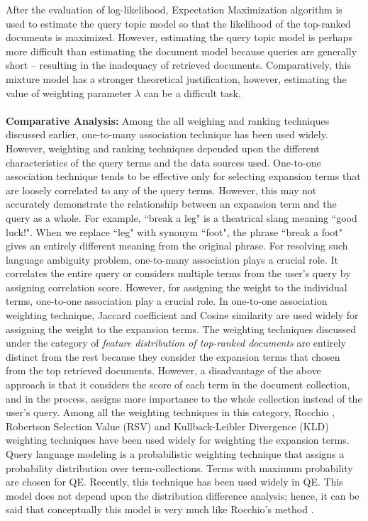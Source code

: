 After the evaluation of log-likelihood, Expectation Maximization algorithm \cite{dempster1977maximum} is used to estimate the query topic model so that the likelihood of the top-ranked documents is maximized. However, estimating the query topic model is perhaps more difficult than estimating the document model because queries are generally short -- resulting in the inadequacy of retrieved documents.  Comparatively, this mixture model has a stronger theoretical justification, however, estimating the value of weighting parameter $\lambda$ can be a difficult task.
\\\\
\textbf{Comparative Analysis:}
Among the all weighing and ranking techniques discussed earlier, one-to-many association technique has been used widely. However, weighting and ranking techniques depended upon the different characteristics of the query terms and  the data sources used. One-to-one association technique tends to be effective only for selecting expansion terms that are loosely correlated to any of the query terms. However, this may not accurately demonstrate the relationship between an expansion term and the query as a whole. For example, ``break a leg" is a theatrical slang meaning ``good luck!".  When we replace ``leg" with synonym ``foot", the phrase ``break a foot" gives an  entirely different meaning from the original phrase. For resolving such language ambiguity problem, one-to-many association plays a crucial role. It correlates the entire query or considers  multiple terms from the user's query by assigning correlation score. However, for assigning the weight to the individual terms, one-to-one association play a crucial role. In one-to-one association weighting technique, Jaccard coefficient \cite{jaccard1912distribution} and Cosine similarity \cite{attar1977local} are used widely for assigning the weight to the expansion terms. The weighting techniques discussed under the category of \textit{feature distribution of top-ranked documents} are entirely distinct from the rest because they consider the expansion terms that chosen from the top retrieved documents. However, a disadvantage of the above approach is that it considers the score of each term in the document collection, and in the process, assigns more importance to the whole collection instead of the user's query. Among all the weighting techniques in this category, Rocchio \cite{rocchio1971relevance}, Robertson Selection Value (RSV) \cite{robertson1976relevance} and Kullback-Leibler Divergence (KLD) \cite{carpineto2001information} weighting techniques have been used widely for weighting the expansion terms. Query language modeling is a probabilistic weighting technique that assigns a probability distribution over term-collections. Terms with maximum probability are chosen for QE. Recently, this technique has been used widely in QE. This model does not depend upon the distribution difference analysis; hence, it can be said that conceptually this model is very much like Rocchio's method \cite{rocchio1971relevance}.  


